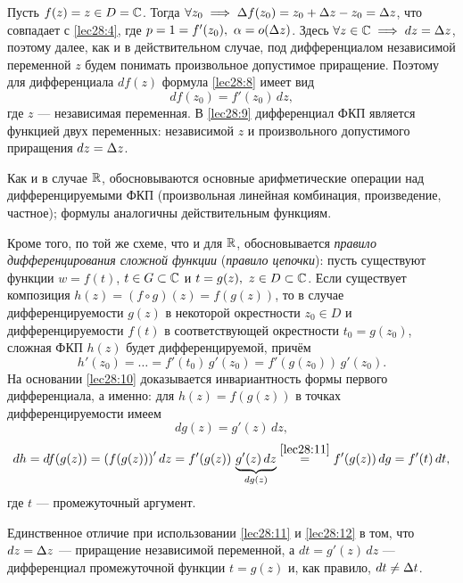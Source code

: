 \documentclass[../../main.tex]{subfiles}
\begin{document}
\begin{exmp}
Пусть $f(z) = z \in D = \mathbb{C}$. Тогда $\forall z_0 \implies
\Delta f(z_0) = z_0 + \Delta z - z_0 = \Delta z$, что совпадает с \eqref{lec28:4},
где $p = 1 = f'(z_0),\ \alpha = o(\Delta z)$.
Здесь $\forall z \in \mathbb{C} \implies dz = \Delta z$,
поэтому далее, как и в действительном случае, под дифференциалом
независимой переменной $z$ будем понимать произвольное допустимое приращение.
Поэтому для дифференциала $df(z)$ формула \eqref{lec28:8} имеет вид
\begin{equation}
\label{lec28:9}
d f(z_0) = f'(z_0)\, dz,
\end{equation}
где $z$ --- независимая переменная.
В \eqref{lec28:9} дифференциал ФКП является функцией двух переменных:
независимой $z$ и произвольного допустимого приращения $dz = \Delta z$.
\end{exmp}

Как и в случае $\mathbb{R}$, обосновываются основные арифметические операции над
дифференцируемыми ФКП (произвольная линейная комбинация, произведение, 
частное);
формулы аналогичны действительным функциям.

Кроме того, по той же схеме, что и для $\mathbb{R}$, обосновывается \emph{правило
дифференцирования сложной функции} (\emph{правило цепочки}):
пусть существуют функции $w = f(t)$, $t \in G \subset \mathbb{C}$ и
$t = g(z),\ z \in D \subset \mathbb{C}$.
Если существует композиция $h(z) = \left(f \circ g\right) (z) =
f(g(z))$, то в случае дифференцируемости $g(z)$
в некоторой окрестности $z_0 \in D$ и дифференцируемости $f(t)$ в 
соответствующей окрестности $t_0 = g(z_0)$, сложная ФКП $h(z)$ будет
дифференцируемой, причём
\begin{equation}
\label{lec28:10}
h'(z_0) = \ldots = f'(t_0)\, g'(z_0) = f'(g(z_0))\, g'(z_0).
\end{equation}
На основании \eqref{lec28:10} доказывается инвариантность формы
первого дифференциала, а именно: для $h(z) = f(g(z))$ в точках 
дифференцируемости
имеем
\begin{equation}
\label{lec28:11}
d g(z) = g'(z)\, dz,
\end{equation}
\begin{equation}
\label{lec28:12}
dh = d f(g(z)) = \left(f(g(z))\right)' dz = f'(g(z))\,
\underbrace{g'(z)\, dz}_{d g(z)} \stk{lec28:11}{=} f'(g(z))\, dg = f'(t)\, dt,
\end{equation}
где $t$ --- промежуточный аргумент.

Единственное отличие при использовании \eqref{lec28:11} и \eqref{lec28:12}
в том, что $dz = \Delta z$ --- приращение независимой переменной,
а $dt = g'(z)\, dz$ --- дифференциал промежуточной функции $t = g(z)$ и,
как правило, $dt \ne \Delta t$.
\end{document}
